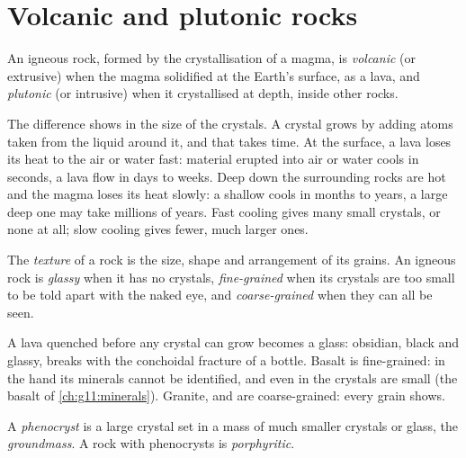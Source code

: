 \section{Volcanic and plutonic rocks}

\begin{definition}\label{def:g11:igneous-rocks:volcanic-plutonic}
An igneous rock, formed by the crystallisation of a magma, is
\emph{volcanic}
(or extrusive) when the magma solidified at the Earth's surface, as a lava,
and \emph{plutonic} (or intrusive) when it crystallised
at depth, inside other rocks.
\end{definition}

The difference shows in the size of the crystals. A crystal grows by adding
atoms taken from the liquid around it, and that takes time. At the surface,
a lava loses its heat to the air or water fast: material erupted into air or
water cools in seconds, a lava flow in days to weeks. Deep down the
surrounding rocks are hot and the magma loses its heat slowly: a shallow
 cools in months to years, a large deep one may take millions of
years. Fast cooling gives many small crystals, or none at all; slow cooling
gives fewer, much larger ones.

\begin{definition}[Texture]\label{def:g11:igneous-rocks:texture}
The \emph{texture} of a rock is the size, shape
and arrangement of its grains. An igneous rock is \emph{glassy} when it
has no crystals, \emph{fine-grained} when its crystals are too small to be
told apart with the naked eye, and \emph{coarse-grained} when they can all
be seen.
\end{definition}

A lava quenched before any crystal can grow becomes a glass: obsidian, black
and glassy, breaks with the conchoidal fracture of a bottle. Basalt is
fine-grained: in the hand its minerals cannot be identified, and even in
 the crystals are small (the basalt of \cref{ch:g11:minerals}).
Granite,  and  are coarse-grained: every grain shows.

\begin{definition}\label{def:g11:igneous-rocks:porphyritic}
A \emph{phenocryst} is a large crystal set in a mass of
much smaller crystals or glass, the \emph{groundmass}. A rock with
phenocrysts is \emph{porphyritic}.
\end{definition}

